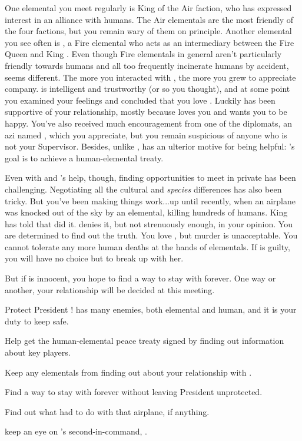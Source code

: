 \documentclass[char]{elementals}
\begin{document}
One elemental you meet regularly is King \cKing{\intro} of the Air faction, who has expressed interest in an alliance with humans.  The Air elementals are the most friendly of the four factions, but you remain wary of them on principle.  Another elemental you see often is \cJuliet{\intro}, a Fire elemental who acts as an intermediary between the Fire Queen \cQueen{\intro} and King \cKing{}.  Even though Fire elementals in general aren't particularly friendly towards humans and all too frequently incinerate humans by accident, \cJuliet{} seems different.  The more you interacted with \cJuliet{\them}, the more you grew to appreciate \cJuliet{\their} company.  \cJuliet{\They} is intelligent and trustworthy (or so you thought), and at some point you examined your feelings and concluded that you love \cJuliet{\them}.  Luckily \cLeader{} has been supportive of your relationship, mostly because \cLeader{\they} loves you and wants you to be happy.  You've also received much encouragement from one of the diplomats, an azi named \cDiplomat{\intro}, which you appreciate, but you remain suspicious of anyone who is not your Supervisor.  Besides, unlike \cLeader{}, \cDiplomat{\they} has an ulterior motive for being helpful: \cDiplomat{}'s goal is to achieve a human-elemental treaty.

Even with \cLeader{} and \cDiplomat{}'s help, though, finding opportunities to meet \cJuliet{} in private has been challenging.  Negotiating all the cultural and \emph{species} differences has also been tricky.   But you've been making things work...up until recently, when an airplane was knocked out of the sky by an elemental, killing hundreds of humans.  King \cKing{} has told \cLeader{} that \cJuliet{} did it.  \cJuliet{\They} denies it, but not strenuously enough, in your opinion.  You are determined to find out the truth.  You love \cJuliet{\them}, but murder is unacceptable.  You cannot tolerate any more human deaths at the hands of elementals.  If \cJuliet{\they} is guilty, you will have no choice but to break up with her.  

But if \cJuliet{\they} is innocent, you hope to find a way to stay with \cJuliet{\them} forever.  One way or another, your relationship will be decided at this meeting.




\begin{itemz}[Goals]
  \item Protect President \cLeader{}!  \cLeader{\They} has many enemies, both elemental and human, and it is your duty to keep \cLeader{\them} safe.
  \item Help \cLeader{} get the human-elemental peace treaty signed by finding out information about key players.
  \item Keep any elementals from finding out about your relationship with \cJuliet{}.
  \item Find a way to stay with \cJuliet{} forever without leaving President \cLeader{} unprotected.
  \item Find out what \cJuliet{} had to do with that airplane, if anything.
  \item keep an eye on \cLeader{}'s second-in-command, \cDema{}.
\end{itemz}
\end{document}
